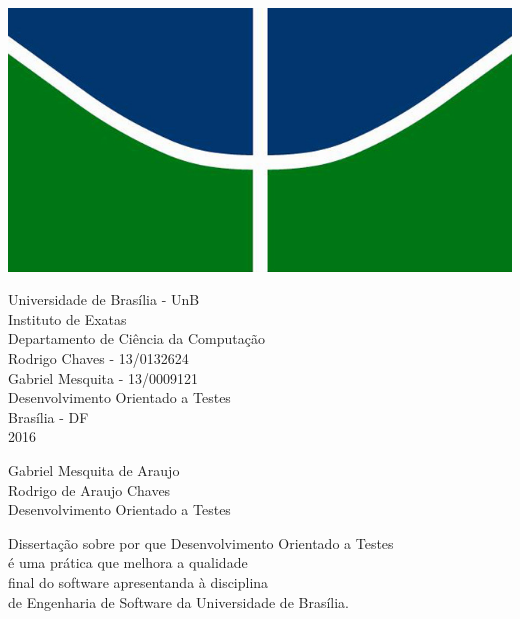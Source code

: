 \documentclass[12pt]{article}
\begin{document}
    \begin{center}
    \includegraphics[scale=0.5]{unb}
    \par
    \vspace{15mm}
    \normalsize{Universidade de Brasília - UnB}\\
    \normalsize{Instituto de Exatas}\\
    \normalsize{Departamento de Ciência da Computação}\\
    \vspace{15mm}
    \normalsize{Rodrigo Chaves - 13/0132624}\\
    \normalsize{Gabriel Mesquita - 13/0009121}\\
    \vspace{15mm}
    \Huge{Desenvolvimento Orientado a Testes}\\

    \vspace{60mm}
    \normalsize{Brasília - DF}\\
    \textnormal{2016}
  \end{center}

  \clearpage

  \begin{center}
    Gabriel Mesquita de Araujo\\
    Rodrigo de Araujo Chaves\\
    \vspace{30mm}
    \Huge{Desenvolvimento Orientado a Testes}
    \vspace{30mm}
    \normalsize{}
    \begin{flushright}
      Dissertação sobre por que Desenvolvimento Orientado a Testes\\
      é uma prática que melhora a qualidade\\
      final do software apresentanda à disciplina\\
      de Engenharia de Software da Universidade de Brasília.\\
    \end{flushright}
  \end{center}
\end{document}
